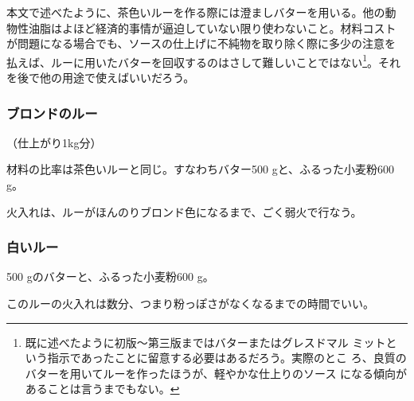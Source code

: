 \begin{recette}
本文で述べたように、茶色いルーを作る際には澄ましバターを用いる。他の動
物性油脂はよほど経済的事情が逼迫していない限り使わないこと。材料コスト
が問題になる場合でも、ソースの仕上げに不純物を取り除く際に多少の注意を
払えば、ルーに用いたバターを回収するのはさして難しいことではない\footnote{既に述べたように初版〜第三版まではバターまたはグレスドマル
  ミットという指示であったことに留意する必要はあるだろう。実際のとこ
  ろ、良質のバターを用いてルーを作ったほうが、軽やかな仕上りのソース
  になる傾向があることは言うまでもない。}。それ
を後で他の用途で使えばいいだろう。

\maeaki

\hypertarget{roux-blond}{%
\subsubsection{ブロンドのルー}\label{roux-blond}}



（仕上がり1kg分）

材料の比率は茶色いルーと同じ。すなわちバター500 gと、ふるった小麦粉600
g。

火入れは、ルーがほんのりブロンド色になるまで、ごく弱火で行なう。

\maeaki

\hypertarget{roux-blanc}{%
\subsubsection{白いルー}\label{roux-blanc}}


 

500 gのバターと、ふるった小麦粉600 g。

このルーの火入れは数分、つまり粉っぽさがなくなるまでの時間でいい。
\end{recette}